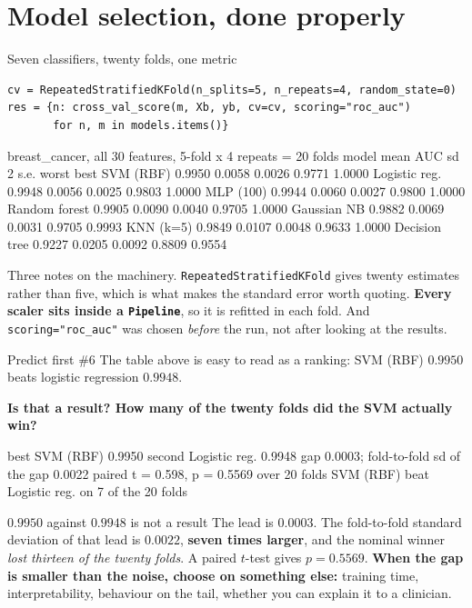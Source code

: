 \documentclass[aspectratio=169]{beamer}
\begin{document}
\section[Selection]{Model selection, done properly}
\label{sec:selection}

\begin{frame}[fragile,shrink=8]{Seven classifiers, twenty folds, one metric}
\begin{lstlisting}
cv = RepeatedStratifiedKFold(n_splits=5, n_repeats=4, random_state=0)
res = {n: cross_val_score(m, Xb, yb, cv=cv, scoring="roc_auc")
       for n, m in models.items()}
\end{lstlisting}
\begin{outblk}
breast_cancer, all 30 features, 5-fold x 4 repeats = 20 folds
model             mean AUC     sd   2 s.e.    worst    best
SVM (RBF)         0.9950  0.0058  0.0026   0.9771  1.0000
Logistic reg.     0.9948  0.0056  0.0025   0.9803  1.0000
MLP (100)         0.9944  0.0060  0.0027   0.9800  1.0000
Random forest     0.9905  0.0090  0.0040   0.9705  1.0000
Gaussian NB       0.9882  0.0069  0.0031   0.9705  0.9993
KNN (k=5)         0.9849  0.0107  0.0048   0.9633  1.0000
Decision tree     0.9227  0.0205  0.0092   0.8809  0.9554
\end{outblk}
\begin{center}\small
  Three notes on the machinery. \texttt{RepeatedStratifiedKFold} gives twenty
  estimates rather than five, which is what makes the standard error worth
  quoting. \textbf{Every scaler sits inside a \texttt{Pipeline}}, so it is
  refitted in each fold. And \texttt{scoring="roc\_auc"} was chosen
  \emph{before} the run, not after looking at the results.
\end{center}
\end{frame}

\begin{frame}[fragile,shrink=8]{Predict first \#6}
The table above is easy to read as a ranking: SVM (RBF) $0.9950$ beats
logistic regression $0.9948$.
\begin{center}
  \textbf{Is that a result? How many of the twenty folds did the SVM actually
  win?}
\end{center}
\begin{outblk}
best   SVM (RBF)        0.9950
second Logistic reg.    0.9948
gap 0.0003;  fold-to-fold sd of the gap 0.0022
paired t = 0.598, p = 0.5569 over 20 folds
SVM (RBF) beat Logistic reg. on 7 of the 20 folds
\end{outblk}
\begin{alertblock}{$0.9950$ against $0.9948$ is not a result}
  \footnotesize The lead is $0.0003$. The fold-to-fold standard deviation of
  that lead is $0.0022$, \textbf{seven times larger}, and the nominal winner
  \emph{lost thirteen of the twenty folds}. A paired $t$-test gives
  $p = 0.5569$. \textbf{When the gap is smaller than the noise, choose on
  something else:} training time, interpretability, behaviour on the tail,
  whether you can explain it to a clinician.
\end{alertblock}
\end{frame}
\end{document}
